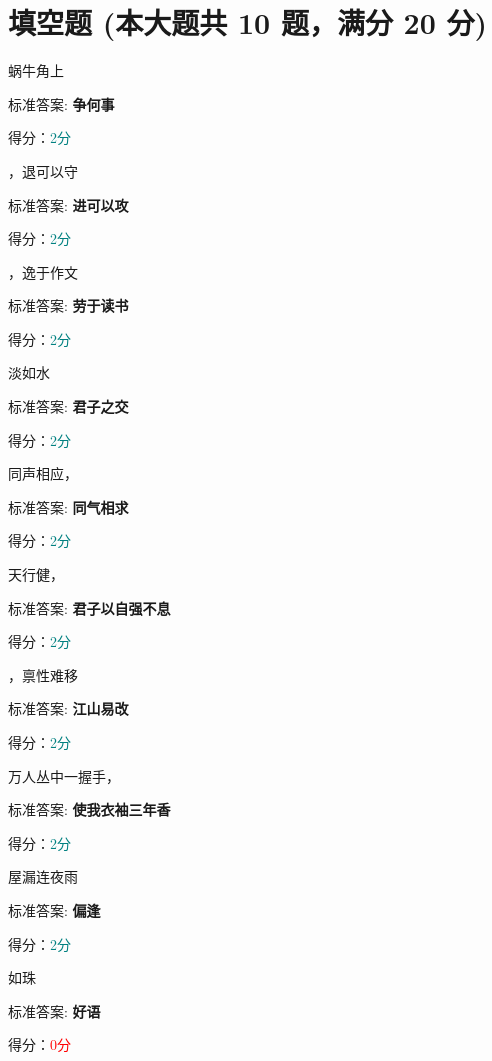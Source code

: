 \documentclass[12pt, a4paper, addpoints, answers]{exam}
\begin{document}
\section{\normalsize{填空题 (本大题共 10 题，满分 20 分)}}
\hspace{1.5cm}
\begin{multicols}{2}
\begin{questions}
\question[2] 蜗牛角上\fillin[争何事] 

标准答案: \textbf{争何事}   

得分：\textcolor{teal}{2分} 

\question[2] \fillin[进可以攻] ，退可以守

标准答案: \textbf{进可以攻}   

得分：\textcolor{teal}{2分} 

\question[2] \fillin[劳于读书] ，逸于作文

标准答案: \textbf{劳于读书}   

得分：\textcolor{teal}{2分} 

\question[2] \fillin[君子之交] 淡如水

标准答案: \textbf{君子之交}   

得分：\textcolor{teal}{2分} 

\question[2] 同声相应，\fillin[同气相求] 

标准答案: \textbf{同气相求}   

得分：\textcolor{teal}{2分} 

\question[2] 天行健，\fillin[君子以自强不息] 

标准答案: \textbf{君子以自强不息}   

得分：\textcolor{teal}{2分} 

\question[2] \fillin[江山易改] ，禀性难移

标准答案: \textbf{江山易改}   

得分：\textcolor{teal}{2分} 

\question[2] 万人丛中一握手，\fillin[使我衣袖三年香] 

标准答案: \textbf{使我衣袖三年香}   

得分：\textcolor{teal}{2分} 

\question[2] 屋漏\fillin[偏逢] 连夜雨

标准答案: \textbf{偏逢}   

得分：\textcolor{teal}{2分} 

\question[2] \fillin 如珠

标准答案: \textbf{好语}   

得分：\textcolor{red}{0分} 
\end{questions}
\end{multicols}
\end{document}
